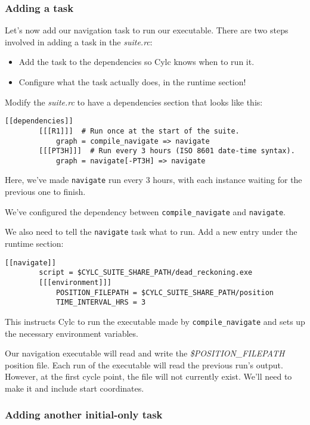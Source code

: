 \subsubsection{Adding a task}

Let's now add our navigation task to run our executable. There are two steps involved in adding a task in the {\em suite.rc}:
\begin{itemize}
    \item Add the task to the dependencies so Cylc knows when to run it.
    \item Configure what the task actually does, in the runtime section!
\end{itemize}

Modify the {\em suite.rc} to have a dependencies section that looks like this:
\lstset{language=suiterc}
\begin{lstlisting}[columns=fullflexible]
    [[dependencies]]
        [[[R1]]]  # Run once at the start of the suite.
            graph = compile_navigate => navigate
        [[[PT3H]]]  # Run every 3 hours (ISO 8601 date-time syntax).
            graph = navigate[-PT3H] => navigate
\end{lstlisting}

Here, we've made \lstinline{navigate} run every 3 hours, with each instance waiting for the previous one to finish.

We've configured the dependency between \lstinline{compile_navigate} and \lstinline{navigate}.

We also need to tell the \lstinline{navigate} task what to run. Add a new entry under the runtime section:

\lstset{language=suiterc}
\begin{lstlisting}[columns=fullflexible]
    [[navigate]]
        script = $CYLC_SUITE_SHARE_PATH/dead_reckoning.exe
        [[[environment]]]
            POSITION_FILEPATH = $CYLC_SUITE_SHARE_PATH/position
            TIME_INTERVAL_HRS = 3
\end{lstlisting}

This instructs Cylc to run the executable made by \lstinline{compile_navigate} and sets up the necessary environment variables.

Our navigation executable will read and write the {\em \$POSITION\_FILEPATH} position file. Each run of the executable will read the previous run's output. However, at the first cycle point, the file will not currently exist. We'll need to make it and include start coordinates.

\subsubsection{Adding another initial-only task}

